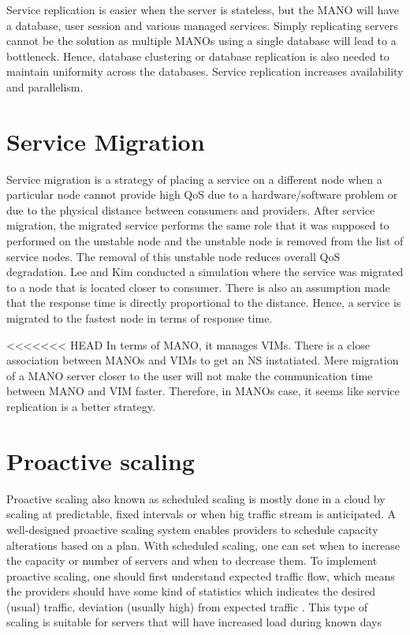 Service replication is easier when the server is stateless, but the MANO will have a database, user session and various managed services. Simply replicating servers cannot be the solution as multiple MANOs using a single database will lead to a bottleneck. Hence, database clustering or database replication is also needed to maintain uniformity across the databases.  
Service replication increases availability and parallelism.


\section{Service Migration}

Service migration is a strategy of placing a service on a different node when a particular node cannot provide high QoS due to a hardware/software problem or due to the physical distance between consumers and providers. After service migration, the migrated service performs the same role that it was supposed to performed on the unstable node and the unstable node is removed from the list of service nodes.
The removal of this unstable node reduces overall QoS degradation.
Lee and Kim \cite{lee_software_2010} conducted a simulation where the service was migrated to a node that is located closer to consumer. There is also an assumption made that the response time is directly proportional to the distance. Hence, a service is migrated to the fastest node in terms of response time.

<<<<<<< HEAD
In terms of MANO, it manages VIMs. There is a close association between MANOs and VIMs to get an NS instatiated.
Mere migration of a MANO server closer to the user will not make the communication time between MANO and VIM faster. Therefore, in MANOs case, it seems like service replication is a better strategy.


\section{Proactive scaling}

Proactive scaling also known as scheduled scaling is mostly done in a cloud by scaling at predictable, fixed intervals or when big traffic stream is anticipated. A well-designed proactive scaling system enables providers to schedule capacity alterations based on a plan.
With scheduled scaling, one can set when to increase the capacity or number of servers and when to decrease them. To implement proactive scaling, one should first understand expected traffic flow, which means the providers should have some kind of statistics which indicates the desired (usual) traffic, deviation (usually high) from expected traffic \cite{falatah_cloud_2014} \cite{reese_cloud_nodate}. This type of scaling is suitable for servers that will have increased load during known days 

